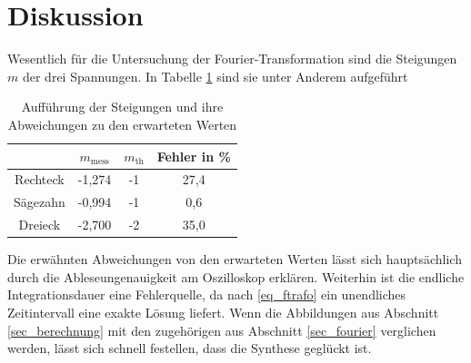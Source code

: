 \section{Diskussion}
Wesentlich für die Untersuchung der Fourier-Transformation sind die Steigungen $m$ der drei Spannungen. In Tabelle \ref{tab_diskus}
sind sie unter Anderem aufgeführt
\begin{table}[H]
 \begin{tabular}{c|c|c|c}
&  	$m_{\text{mess}}$&	$m_{\text{th}}$&	Fehler in \% \\
\hline
Rechteck&	-1,274&	-1&	27,4\\
Sägezahn&	-0,994&	-1&	0,6\\
Dreieck&	-2,700&	-2&	35,0
 \end{tabular}
\caption{Aufführung der Steigungen und ihre Abweichungen zu den erwarteten Werten}
\label{tab_diskus}
\end{table}
Die erwähnten Abweichungen von den erwarteten Werten lässt sich hauptsächlich durch die Ableseungenauigkeit am Oszilloskop erklären. 
Weiterhin ist die endliche Integrationsdauer eine Fehlerquelle, da nach \eqref{eq_ftrafo} ein unendliches Zeitintervall eine exakte
Lösung liefert.
Wenn die Abbildungen aus Abschnitt \ref{sec_berechnung} mit den zugehörigen aus Abschnitt \ref{sec_fourier} verglichen werden, lässt
sich schnell festellen, dass die Synthese geglückt ist.







